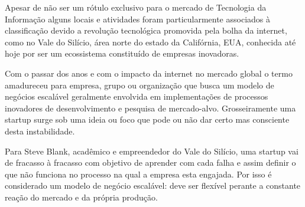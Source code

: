 \par Apesar de não ser um rótulo exclusivo para o mercado de Tecnologia da Informação alguns locais e atividades foram particularmente associados à classificação devido a revolução tecnológica promovida pela bolha da internet, como no Vale do Silício, área norte do estado da Califórnia, EUA, conhecida até hoje por ser um ecossistema constituído de empresas inovadoras.
\par Com o passar dos anos e com o impacto da internet no mercado global o termo amadureceu para empresa, grupo ou organização que busca um modelo de negócios escalável geralmente envolvida em implementações de processos inovadores de desenvolvimento e pesquisa de mercado-alvo. Grosseiramente uma startup surge sob uma ideia ou foco que pode ou não dar certo mas consciente desta instabilidade.
\par Para Steve Blank, acadêmico e empreendedor do Vale do Silício, uma startup vai de fracasso à fracasso com objetivo de aprender com cada falha e assim definir o que não funciona no processo na qual a empresa esta engajada. Por isso é considerado um modelo de negócio escalável: deve ser flexível perante a constante reação do mercado e da própria produção.

